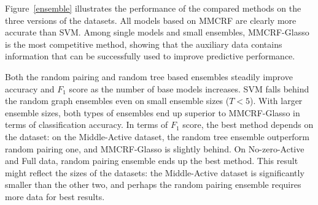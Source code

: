 \documentclass[runningheads,a4paper]{llncs}
\begin{document}
Figure~\ref{ensemble} illustrates the performance of the compared methods on the three versions of the datasets. All models based on MMCRF are clearly more accurate than SVM. Among single models and small ensembles, MMCRF-Glasso is the most competitive method, showing that the auxiliary data contains information that can be successfully used to improve predictive performance. 

Both the random pairing and random tree based ensembles steadily improve accuracy and $F_1$ score as the number of base models increases. SVM falls behind the random graph ensembles even on small ensemble sizes ($T < 5$). With larger ensemble sizes, both types of  ensembles end up superior to MMCRF-Glasso in terms of classification accuracy. In terms of $F_1$ score, the best method depends on the dataset: on the Middle-Active dataset, the random tree ensemble outperform random pairing one, and MMCRF-Glasso is slightly behind. On No-zero-Active and Full data, random pairing ensemble ends up the best method. This result might reflect the sizes of the datasets: the Middle-Active dataset is significantly smaller than the other two, and perhaps the random pairing ensemble requires more data for best results.
\end{document}

